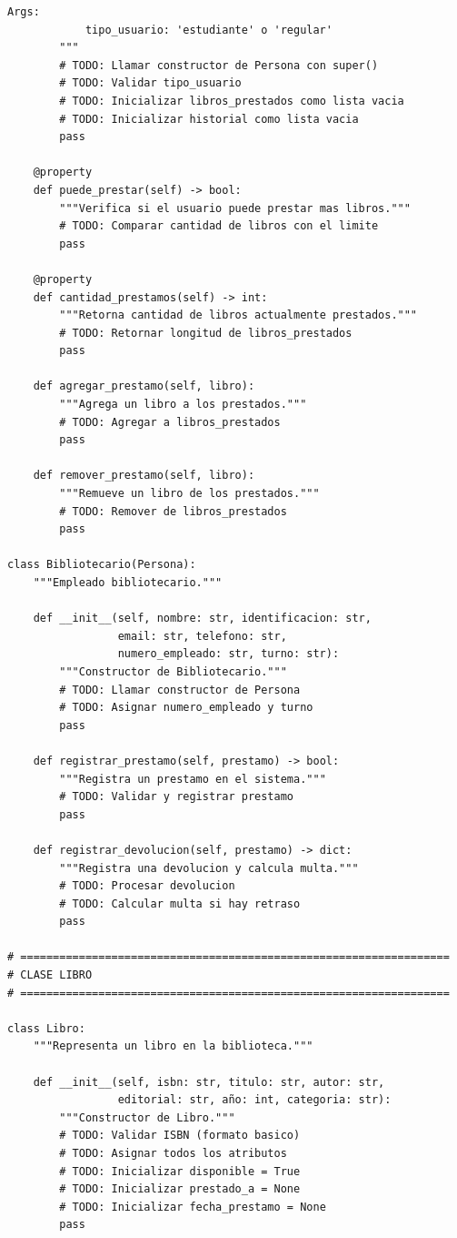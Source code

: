 \documentclass[11pt,letterpaper]{article}
\begin{document}
\begin{lstlisting}[caption={Plantilla de clases principales}]
        Args:
            tipo_usuario: 'estudiante' o 'regular'
        """
        # TODO: Llamar constructor de Persona con super()
        # TODO: Validar tipo_usuario
        # TODO: Inicializar libros_prestados como lista vacia
        # TODO: Inicializar historial como lista vacia
        pass
    
    @property
    def puede_prestar(self) -> bool:
        """Verifica si el usuario puede prestar mas libros."""
        # TODO: Comparar cantidad de libros con el limite
        pass
    
    @property
    def cantidad_prestamos(self) -> int:
        """Retorna cantidad de libros actualmente prestados."""
        # TODO: Retornar longitud de libros_prestados
        pass
    
    def agregar_prestamo(self, libro):
        """Agrega un libro a los prestados."""
        # TODO: Agregar a libros_prestados
        pass
    
    def remover_prestamo(self, libro):
        """Remueve un libro de los prestados."""
        # TODO: Remover de libros_prestados
        pass

class Bibliotecario(Persona):
    """Empleado bibliotecario."""
    
    def __init__(self, nombre: str, identificacion: str, 
                 email: str, telefono: str, 
                 numero_empleado: str, turno: str):
        """Constructor de Bibliotecario."""
        # TODO: Llamar constructor de Persona
        # TODO: Asignar numero_empleado y turno
        pass
    
    def registrar_prestamo(self, prestamo) -> bool:
        """Registra un prestamo en el sistema."""
        # TODO: Validar y registrar prestamo
        pass
    
    def registrar_devolucion(self, prestamo) -> dict:
        """Registra una devolucion y calcula multa."""
        # TODO: Procesar devolucion
        # TODO: Calcular multa si hay retraso
        pass

# ==================================================================
# CLASE LIBRO
# ==================================================================

class Libro:
    """Representa un libro en la biblioteca."""
    
    def __init__(self, isbn: str, titulo: str, autor: str,
                 editorial: str, año: int, categoria: str):
        """Constructor de Libro."""
        # TODO: Validar ISBN (formato basico)
        # TODO: Asignar todos los atributos
        # TODO: Inicializar disponible = True
        # TODO: Inicializar prestado_a = None
        # TODO: Inicializar fecha_prestamo = None
        pass
    

\end{lstlisting}
\end{document}
